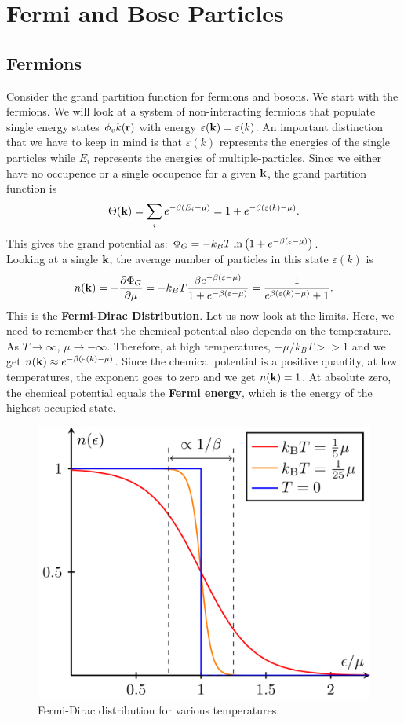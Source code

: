 \chapter{Fermi and Bose Particles}
    \section{Fermions}    
        Consider the grand partition function for fermions and bosons. We start with the fermions. We will look at a system of non-interacting fermions that populate single energy states $\phi_v{k}(\mathbf{r})$ with energy $\varepsilon(\mathbf{k})=\varepsilon(k)$. An important distinction that we have to keep in mind is that $\varepsilon(k)$ represents the energies of the single particles while $E_i$ represents the energies of multiple-particles. Since we either have no occupence or a single occupence for a given $\mathbf{k}$, the grand partition function is
        \begin{equation}
            \Theta(\mathbf{k}) = \sum_ie^{-\beta(E_i-\mu)} = 1+e^{-\beta(\varepsilon(k)-\mu)}.
        \end{equation}
        This gives the grand potential as: $\Phi_G = -k_BT\ln\left( 1+e^{-\beta(\varepsilon-\mu)} \right)$. \\
        Looking at a single $\mathbf{k}$, the average number of particles in this state $\varepsilon(k)$ is
        \begin{equation}
            n(\mathbf{k}) = -\frac{\partial \Phi_G}{\partial \mu} = -k_BT\frac{\beta e^{-\beta(\varepsilon-\mu)}}{1+e^{-\beta(\varepsilon-\mu)}} = \frac{1}{e^{\beta(\varepsilon(k)-\mu)}+1}.
        \end{equation}
        This is the \textbf{Fermi-Dirac Distribution}. Let us now look at the limits. Here, we need to remember that the chemical potential also depends on the temperature. As $T\to\infty$, $\mu\to-\infty$. Therefore, at high temperatures, $-\mu/k_BT>>1$ and we get $ n(\mathbf{k}) \approx e^{-\beta(\varepsilon(k)-\mu)}$. Since the chemical potential is a positive quantity, at low temperatures, the exponent goes to zero and we get $n(\mathbf{k})=1$. At absolute zero, the chemical potential equals the \textbf{Fermi energy}, which is the energy of the highest occupied state.
        \begin{figure}[h!]
            \centering
            \includegraphics[width=0.3\linewidth]{fermidirac.png}
            \caption{Fermi-Dirac distribution for various temperatures.}
            \label{fig:fermidirac}
        \end{figure}

